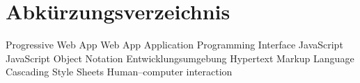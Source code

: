 \chapter*{Abkürzungsverzeichnis}
\pagestyle{plain}

\begin{acronym}[AUTOSAR]

   				{Progressive Web App}
 			{Web App}
  				{Application Programming Interface}
  				{JavaScript}
  				{JavaScript Object Notation}
  				{Entwicklungsumgebung}
 				{Hypertext Markup Language}
 				{Cascading Style Sheets}
 				{Human–computer interaction}
\end{acronym}